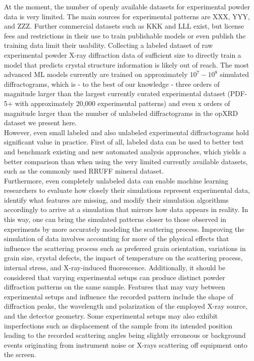 At the moment, the number of openly available datasets for experimental powder data is very limited. The main sources for experimental patterns are XXX, YYY, and ZZZ. Further commercial datasets such as KKK and LLL exist, but license fees and restrictions in their use to train publishable models or even publish the training data limit their usability. Collecting a labeled dataset of raw experimental powder X-ray diffraction data of sufficient size to directly train a model that predicts crystal structure information is likely out of reach. The most advanced ML models currently are trained on approximately $10^7 - 10^8$ simulated diffractograms, which is - to the best of our knowledge - three orders of magnitude larger than the largest currently curated experimental dataset (PDF-5+ with approximately 20,000 experimental patterns) and even x orders of magnitude larger than the number of unlabeled diffractograms in the opXRD dataset we present here. \\

However, even small labeled and also unlabeled experimental diffractograms hold significant value in practice. First of all, labeled data can be used to better test and benchmark existing and new automated analysis approaches, which yields a better comparison than when using the very limited currently available datasets, such as the commonly used RRUFF mineral dataset\cite{Armbruster2015}. \\

Furthermore, even completely unlabeled data can enable machine learning researchers to evaluate how closely their simulations represent experimental data, identify what features are missing, and modify their simulation algorithms accordingly to arrive at a simulation that mirrors how data appears in reality. In this way, one can bring the simulated patterns closer to those observed in experiments by more accurately modeling the scattering process. Improving the simulation of data involves accounting for more of the physical effects that influence the scattering process such as preferred grain orientation, variations in grain size, crystal defects, the impact of temperature on the scattering process, internal stress, and X-ray-induced fluorescence. \cite{cao2024simxrd} Additionally, it should be considered that varying experimental setups can produce distinct powder diffraction patterns on the same sample. Features that may vary between experimental setups and influence the recorded pattern include the shape of diffraction peaks, the wavelength and polarization of the employed X-ray source, and the detector geometry. Some experimental setups may also exhibit imperfections such as displacement of the sample from its intended position leading to the recorded scattering angles being slightly erroneous or background events originating from instrument noise or  X-rays scattering off equipment onto the screen.\\


